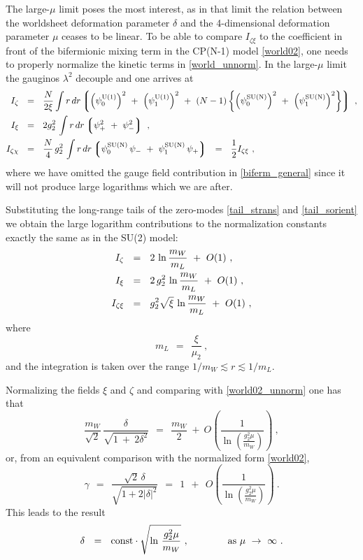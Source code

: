 \documentclass{article}
\newcommand{\lgr}{\left\lgroup}
\newcommand{\rgr}{\right\rgroup}
\begin{document}
The large-$\mu$ limit poses the most interest, as in that limit the relation between the 
worldsheet deformation parameter $ \delta $ and the 4-dimensional deformation parameter $\mu$
ceases to be linear. 
To be able to compare $ I_{\zeta\xi} $ to the coefficient in front of the bifermionic mixing term in 
the CP(N-1) model \eqref{world02}, one needs to properly normalize the kinetic terms in \eqref{world_unnorm}.
In the large-$\mu$ limit the gauginos $ \lambda^2 $ decouple and one arrives at
\begin{align}
%
\notag
	I_\zeta & ~~=~~ \frac{N}{2\xi} 
		\int r\, dr 
			\lgr \left(\poU\right)^2 ~+~ \left(\plU\right)^2 ~+~ 
				(N-1)\left\{\left(\poN\right)^2 ~+~
				            \left(\plN\right)^2 \right\} 
			\rgr~, \\
%
\label{norm_int}
	I_\xi & ~~=~~ 2g_2^2\, 
		\int r\, dr \lgr  \psi_+^2 ~+~ \psi_-^2 \rgr~, \\
%
\notag
	I_{\zeta\chi} & ~~=~~
		\frac{N}{4}\, g_2^2\, 
		\int r\, dr \lgr \poN\, \psi_- ~+~ \plN\, \psi_+ \rgr 
		 ~~=~~ \frac 1 2 I_{\zeta\xi}~,
\end{align}
	where we have omitted the gauge field contribution in \eqref{biferm_general} since it will not
	produce large logarithms which we are after.

	Substituting the long-range tails of the zero-modes 
	\eqref{tail_strans} and \eqref{tail_sorient} we obtain
	the large logarithm contributions to the normalization constants exactly the same as in the
	SU(2) model:
\begin{align}
%
\notag
	I_\zeta & ~~=~~ 2\, \ln \frac{m_W}{m_L} ~+~ O(1)~, \\
%
\label{norm_int_eval}
	I_\xi & ~~=~~ 2\,g_2^2 \, \ln \frac{m_W}{m_L} ~+~ O(1)~, \\
%
\notag
	I_{\zeta\xi} & ~~=~~ g_2^2\sqrt{\xi}\, \ln \frac{m_W}{m_L} ~+~ O(1)~, 
\end{align}
	where
\[
	m_L ~~=~~ \frac{\xi}{\mu_2}~,
\]
	and the integration is taken over the range $ 1/m_W \lesssim r \lesssim 1/m_L $.

	Normalizing the fields $ \xi $ and $ \zeta $ and comparing with \eqref{world02_unnorm} one has that
\[
	\frac{m_W}{\sqrt{2}}\, \frac{\delta}{\sqrt{1 ~+~ 2\delta^2}} ~~=~~ 
		\frac{m_W}{2} ~+~ O\left(\frac{1}{\ln\left(\frac{g_2^2\mu}{m_W}\right)}\right)~,
\]
	or, from an equivalent comparison with the normalized form \eqref{world02},
\[
	\gamma ~~=~~ 
		\frac { \sqrt{2}\,\delta } { \sqrt{ 1 + 2 | \delta |^2 } } 
		~~=~~ 1 ~~+~~ O\left(\frac{1}{\ln\left(\frac{g_2^2\mu}{m_W}\right)}\right)~.
\]
	This leads to the result
\[
	\delta~~=~~ 
	{\rm const} \cdot \sqrt{\ln\, \frac{g_2^2\mu}{m_W}}~,
	\qquad\qquad \text{as $\mu ~\to~ \infty$}~.
\]
\end{document}
